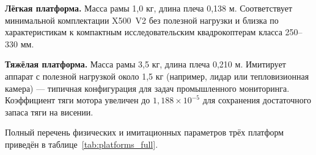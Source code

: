 \textbf{Лёгкая платформа.} Масса рамы 1,0 кг, длина плеча 0,138 м. Соответствует минимальной комплектации X500~V2 без полезной нагрузки и близка по характеристикам к компактным исследовательским квадрокоптерам класса 250--330 мм.

\textbf{Тяжёлая платформа.} Масса рамы 3,5 кг, длина плеча 0,210 м. Имитирует аппарат с полезной нагрузкой около 1,5 кг (например, лидар или тепловизионная камера) — типичная конфигурация для задач промышленного мониторинга. Коэффициент тяги мотора увеличен до $1{,}188 \times 10^{-5}$ для сохранения достаточного запаса тяги на висении.

Полный перечень физических и имитационных параметров трёх платформ приведён в таблице~\ref{tab:platforms_full}.

\begin{table}[htbp]
	\centering
	\footnotesize
	\caption{Физические и имитационные параметры экспериментальных платформ. Параметры, отличающиеся от базовой, выделены жирным шрифтом. Разрыв платформы $\Delta = m / m_{\mathrm{base}}$ характеризует величину доменного сдвига.}
	\label{tab:platforms_full}
	\setlength{\tabcolsep}{3pt}
\end{table}
